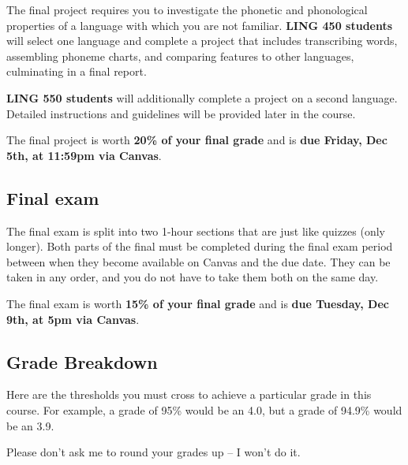 \documentclass[12pt, letterpaper]{article}
\begin{document}
The final project requires you to investigate the phonetic and phonological properties of a language with which you are not familiar. \textbf{LING 450 students} will select one language and complete a project that includes transcribing words, assembling phoneme charts, and comparing features to other languages, culminating in a final report. 

\textbf{LING 550 students} will additionally complete a project on a second language. Detailed instructions and guidelines will be provided later in the course.

The final project is worth \textbf{20\% of your final grade} and is \textbf{due Friday, Dec 5th, at 11:59pm via Canvas}.

\subsection*{Final exam} \label{sec:reading_responses}

The final exam is split into two 1-hour sections that are just like quizzes (only longer). Both parts of the final must be completed during the final exam period between when they become available on Canvas and the due date. They can be taken in any order, and you do not have to take them both on the same day.

The final exam is worth \textbf{15\% of your final grade} and is \textbf{due Tuesday, Dec 9th, at 5pm via Canvas}.




\subsection*{Grade Breakdown} \label{sec:grades}

Here are the thresholds you must cross to achieve a particular grade in this course. For example, a grade of 95\% would be an 4.0, but a grade of 94.9\% would be an 3.9. 

Please don’t ask me to round your grades up -- I won’t do it.
\end{document}
